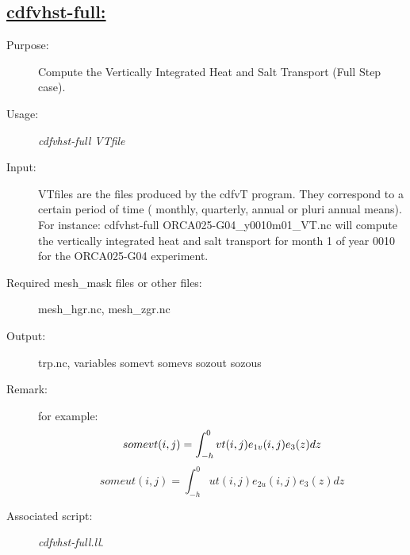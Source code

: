 \documentclass[a4paper,11pt]{article}
\begin{document}
\subsection*{\underline{cdfvhst-full:}}
\begin{description}
\item[Purpose:] Compute the Vertically Integrated  Heat and Salt Transport (Full Step case).
\item[Usage:] {\em cdfvhst-full VTfile }
\item[Input:] VTfiles are the files produced by the cdfvT program.
They correspond to a certain period of time ( monthly, quarterly, annual or
pluri annual means). 
For instance: cdfvhst-full ORCA025-G04\_y0010m01\_VT.nc
will compute the vertically integrated heat and salt transport for month 1 of year 0010 for the ORCA025-G04 experiment.
\item[Required mesh\_mask files or other files:]   mesh\_hgr.nc, mesh\_zgr.nc  \\
\item[Output:]trp.nc, variables somevt somevs sozout sozous 
\item[Remark:] for example:\\
\begin{equation}
somevt(i,j)=\int_{-h}^{0}{vt(i,j)e_{1v}(i,j) e_3(z) dz}  \\
\end{equation}
\begin{equation}
someut(i,j)=\int_{-h}^{0}{ut(i,j)e_{2u}(i,j) e_3(z) dz} 
\end{equation}
\item[Associated script:] {\em cdfvhst-full.ll}. 
\end{description}

\newpage
\end{document}
